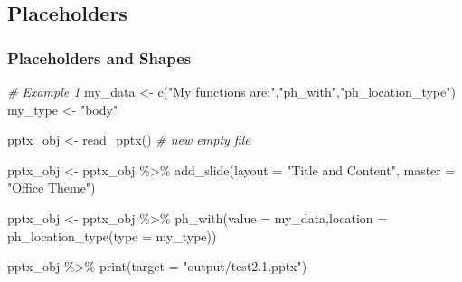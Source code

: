 \documentclass[
]{book}
\newenvironment{Shaded}{\begin{snugshade}}{\end{snugshade}}
\newcommand{\AttributeTok}[1]{\textcolor[rgb]{0.77,0.63,0.00}{#1}}
\newcommand{\CommentTok}[1]{\textcolor[rgb]{0.56,0.35,0.01}{\textit{#1}}}
\newcommand{\FunctionTok}[1]{\textcolor[rgb]{0.00,0.00,0.00}{#1}}
\newcommand{\NormalTok}[1]{#1}
\newcommand{\OtherTok}[1]{\textcolor[rgb]{0.56,0.35,0.01}{#1}}
\newcommand{\SpecialCharTok}[1]{\textcolor[rgb]{0.00,0.00,0.00}{#1}}
\newcommand{\StringTok}[1]{\textcolor[rgb]{0.31,0.60,0.02}{#1}}
\begin{document}
\hypertarget{placeholders}{%
\subsection{Placeholders}\label{placeholders}}

\hypertarget{placeholders-and-shapes}{%
\subsubsection{Placeholders and Shapes}\label{placeholders-and-shapes}}

\begin{Shaded}
\begin{Highlighting}[]
\CommentTok{\# Example 1}
\NormalTok{my\_data }\OtherTok{\textless{}{-}} \FunctionTok{c}\NormalTok{(}\StringTok{"My functions are:"}\NormalTok{,}\StringTok{"ph\_with"}\NormalTok{,}\StringTok{"ph\_location\_type"}\NormalTok{)}
\NormalTok{my\_type }\OtherTok{\textless{}{-}} \StringTok{"body"}

\NormalTok{pptx\_obj }\OtherTok{\textless{}{-}} \FunctionTok{read\_pptx}\NormalTok{() }\CommentTok{\# new empty file}

\NormalTok{pptx\_obj }\OtherTok{\textless{}{-}}\NormalTok{ pptx\_obj }\SpecialCharTok{\%\textgreater{}\%} 
  \FunctionTok{add\_slide}\NormalTok{(}\AttributeTok{layout =} \StringTok{"Title and Content"}\NormalTok{, }\AttributeTok{master =} \StringTok{"Office Theme"}\NormalTok{)}

\NormalTok{pptx\_obj }\OtherTok{\textless{}{-}}\NormalTok{ pptx\_obj }\SpecialCharTok{\%\textgreater{}\%}
  \FunctionTok{ph\_with}\NormalTok{(}\AttributeTok{value =}\NormalTok{ my\_data,}\AttributeTok{location =} \FunctionTok{ph\_location\_type}\NormalTok{(}\AttributeTok{type =}\NormalTok{ my\_type))}

\NormalTok{pptx\_obj }\SpecialCharTok{\%\textgreater{}\%}
  \FunctionTok{print}\NormalTok{(}\AttributeTok{target =} \StringTok{"output/test2.1.pptx"}\NormalTok{) }
\end{Highlighting}
\end{Shaded}
\end{document}
